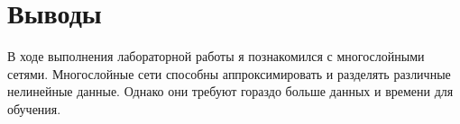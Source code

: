 \section{Выводы}
В ходе выполнения лабораторной работы я познакомился с многослойными сетями. Многослойные сети способны аппроксимировать и разделять различные нелинейные данные. Однако они требуют гораздо больше данных и времени для обучения.
\pagebreak

